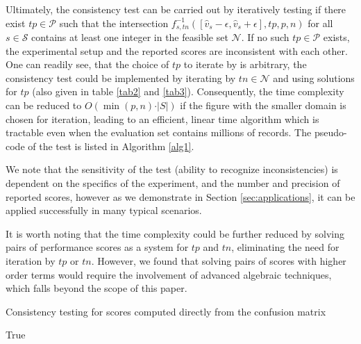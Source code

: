 \documentclass[5p, final]{elsarticle}
\begin{document}
Ultimately, the consistency test can be carried out by iteratively testing if there exist $tp\in\mathcal{P}$  such that the intersection $f_{s, tn}^{-1}([\hat{v}_s - \epsilon, \hat{v}_s + \epsilon], tp, p, n)$ for all $s\in\mathcal{S}$ contains at least one integer in the feasible set $\mathcal{N}$. If no such $tp\in\mathcal{P}$ exists, the experimental setup and the reported scores are inconsistent with each other. 
One can readily see, that the choice of $tp$ to iterate by is arbitrary, the consistency test could be implemented by iterating by $tn\in\mathcal{N}$ and using solutions for $tp$ (also given in table \ref{tab2} and \ref{tab3}). Consequently, the time complexity can be reduced to $O(\min(p, n)\cdot \vert S\vert)$ if the figure with the smaller domain is chosen for iteration, leading to an efficient, linear time algorithm which is tractable even when the evaluation set contains millions of records. The pseudo-code of the test is listed in Algorithm \ref{alg1}.

We note that the sensitivity of the test (ability to recognize inconsistencies) is dependent on the specifics of the experiment, and the number and precision of reported scores, however as we demonstrate in Section \ref{sec:applications}, it can be applied successfully in many typical scenarios.

It is worth noting that the time complexity could be further reduced by solving pairs of performance scores as a system for $tp$ and $tn$, eliminating the need for iteration by $tp$ or $tn$. However, we found that solving pairs of scores with higher order terms would require the involvement of advanced algebraic techniques, which falls beyond the scope of this paper.


\begin{algorithm}[t]
\caption{Consistency testing for scores computed directly from the confusion matrix}\label{alg1}
\begin{small}
\Return True\;
\end{small}
\end{algorithm}
\end{document}
